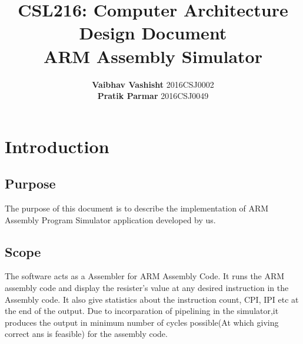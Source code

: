 \documentclass[12pt]{extarticle}
\date{}
\author{\textbf{Vaibhav Vashisht} 2016CSJ0002  \\\textbf{Pratik Parmar} 2016CSJ0049}
\title{\textbf{CSL216: Computer Architecture\\ Design Document \\ ARM Assembly Simulator  }}
\begin{document}
\maketitle
\newpage
\tableofcontents
\newpage
\section{Introduction}

\subsection{Purpose}
The purpose of this document is to describe the implementation of ARM Assembly Program Simulator application developed by us.
\subsection{Scope}
The software acts as a Assembler for ARM Assembly Code. It runs the ARM assembly code and display the resister's value at any desired instruction in the Assembly code. It also give statistics about the instruction count, CPI, IPI etc at the end of the output. Due to incorparation of pipelining in the simulator,it produces the output in minimum number of cycles possible(At which giving correct ans is feasible) for the assembly code. 
\end{document}
